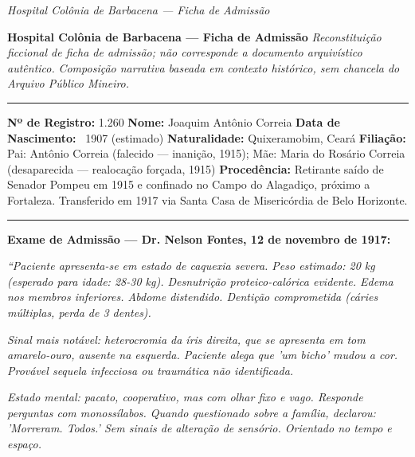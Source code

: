 
\noindent \textit{Hospital Colônia de Barbacena --- Ficha de Admissão}

\noindent \textbf{Hospital Colônia de Barbacena --- Ficha de Admissão}
\textit{Reconstituição ficcional de ficha de admissão; não corresponde a documento arquivístico autêntico.}
\textit{Composição narrativa baseada em contexto histórico, sem chancela do Arquivo Público Mineiro.}

\vspace{0.5em}\noindent\rule{\textwidth}{0.5pt}\vspace{0.5em}

\noindent \textbf{Nº de Registro:} 1.260
\textbf{Nome:} Joaquim Antônio Correia
\textbf{Data de Nascimento:} ~1907 (estimado)
\textbf{Naturalidade:} Quixeramobim, Ceará
\textbf{Filiação:} Pai: Antônio Correia (falecido --- inanição, 1915); Mãe: Maria do Rosário Correia (desaparecida --- realocação forçada, 1915)
\textbf{Procedência:} Retirante saído de Senador Pompeu em 1915 e confinado no Campo do Alagadiço, próximo a Fortaleza. Transferido em 1917 via Santa Casa de Misericórdia de Belo Horizonte.

\vspace{0.5em}\noindent\rule{\textwidth}{0.5pt}\vspace{0.5em}

\noindent \textbf{Exame de Admissão --- Dr. Nelson Fontes, 12 de novembro de 1917:}

\noindent \textit{\textquotedblleft{}Paciente apresenta-se em estado de caquexia severa. Peso estimado: 20 kg (esperado para idade: 28-30 kg). Desnutrição proteico-calórica evidente. Edema nos membros inferiores. Abdome distendido. Dentição comprometida (cáries múltiplas, perda de 3 dentes).}

\noindent \textit{Sinal mais notável: heterocromia da íris direita, que se apresenta em tom amarelo-ouro, ausente na esquerda. Paciente alega que 'um bicho' mudou a cor. Provável sequela infecciosa ou traumática não identificada.}

\noindent \textit{Estado mental: pacato, cooperativo, mas com olhar fixo e vago. Responde perguntas com monossílabos. Quando questionado sobre a família, declarou: 'Morreram. Todos.' Sem sinais de alteração de sensório. Orientado no tempo e espaço.}


